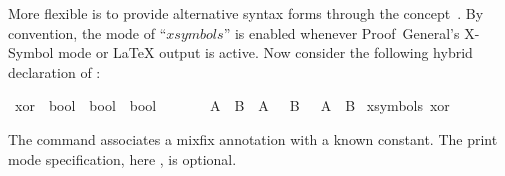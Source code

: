 \begin{isabellebody}
\begin{isamarkuptext}
  More flexible is to provide alternative syntax forms
  through the  concept~\cite{isabelle-ref}.  By
  convention, the mode of ``$xsymbols$'' is enabled whenever
  Proof~General's X-Symbol mode or {\LaTeX} output is active.  Now
  consider the following hybrid declaration of :%
\end{isamarkuptext}%
\isamarkuptrue%
%
\isadelimML
%
\endisadelimML
%
\isatagML
%
\endisatagML
{\isafoldML}%
%
\isadelimML
%
\endisadelimML
{}\isamarkupfalse%
\ xor\ {}{}\ {}bool\ {}\ bool\ {}\ bool{}\ \ \ \ {}\ {}{}{}{}{}{}\ {}{}{}\isanewline
{}\ {}A\ {}{}{}{}\ B\ {}\ {}A\ {}\ {}\ B{}\ {}\ {}{}\ A\ {}\ B{}{}\isanewline
\isanewline
{}\isamarkupfalse%
\ {}xsymbols{}\ xor\ {}\ {}{}{}{}\ {}{}{}%
\isadelimML
%
\endisadelimML
%
\isatagML
%
\endisatagML
{\isafoldML}%
%
\isadelimML
%
\endisadelimML
%
\begin{isamarkuptext}%
\noindent
The  command associates a mixfix
annotation with a known constant.  The print mode specification,
here , is optional.


\end{isamarkuptext}
\end{isabellebody}
